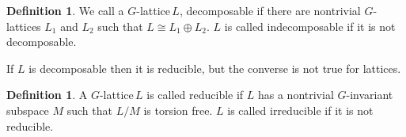 \documentclass[a4paper, 14pt]{extarticle}
\theoremstyle{plain}
\newtheorem{lemma}[theorem]{Lemma}
\theoremstyle{definition}
\newtheorem{definition}[theorem]{Definition}
\newcommand{\Z}{\ensuremath{\mathbb{Z}}}
\newcommand{\G}{G}
\newcommand{\glat}{$G$-lattice}
\begin{document}
\begin{definition}
We call a \glat \,$L$, decomposable if there are nontrivial \glat s $L_1$ and $ L_2$ such that $ L\cong L_1 \oplus L_2$. $L$ is called indecomposable if it is not decomposable.
\end{definition}
\noindent
If $L$ is decomposable then it is reducible, but the converse is not true for lattices.
\begin{definition}
A \glat \,$L$ is called reducible if $L$ has a nontrivial $G$-invariant subspace $M$ such that $L/M$ is torsion free. $L$ is called irreducible if it is not reducible. 
\end{definition}
\end{document}
